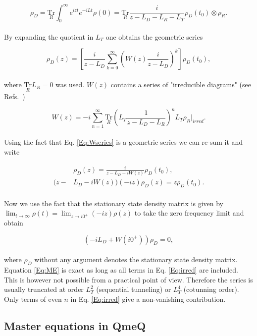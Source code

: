 \documentclass{article}
\newcommand{\Tru}[1]{\ensuremath{\underset{#1}{\text{Tr}}}}
\begin{document}
\begin{equation}
    \rho_D = \Tru{R}\int_0^\infty e^{izt}e^{-iLt}\rho(0)=\Tru{R}\frac{i}{z-L_D-L_R-L_T}\rho_D(t_0)\otimes\rho_R.
\end{equation}
\\
By expanding the quotient in $L_T$ one obtains the geometric series 

\begin{equation}
	\rho_D(z) = \left [ \frac{i}{z-L_D}\sum_{k=0}^{\infty}\left (W(z)\frac{i}{z-L_D}\right)^k\right]\rho_D(t_0),
	\label{Eq:Wseries}
\end{equation}
\\
where $\Tru{R}L_R=0$ was used. $W(z)$ contains a series of "irreducible diagrams" (see Refs.~\cite{leijnse2008kinetic, saptsov2012fermionic})

\begin{equation}
	W(z)=-i\sum_{n=1}^\infty\Tru{R}\left(L_T\frac{1}{z-L_D-L_R}\right )^nL_T\rho_R\Big|_{irred}.
	\label{Eq:irred}
\end{equation}
\\
Using the fact that Eq. \ref{Eq:Wseries} is a geometric series we can re-sum it and write 

\begin{align}
	&\rho_D(z) = \frac{i}{z-L_D-iW(z)}\rho_D(t_0), \\
	(z-&L_D - iW(z))(-iz)\rho_D(z)=z\rho_D(t_0).
\end{align}
\\
Now we use the fact that the stationary state density matrix is given by $\lim_{t\rightarrow \infty}\rho(t) = \lim_{z\rightarrow i0^+}(-iz)\rho(z)$ to take the zero frequency limit and obtain

\begin{equation}
	\left(-iL_D + W(i0^+)\right)\rho_D =0,
	\label{Eq:ME}
\end{equation}
\\
where $\rho_D$ without any argument denotes the stationary state density matrix. Equation \ref{Eq:ME} is exact as long as all terms in Eq. \ref{Eq:irred} are included. This is however not possible from a practical point of view. Therefore the series is usually truncated at order $L_T^2$ (sequential tunneling) or $L_T^4$ (cotunning order). Only terms of even $n$ in Eq. \ref{Eq:irred} give a non-vanishing contribution.
\subsection{Master equations in QmeQ}
\end{document}
